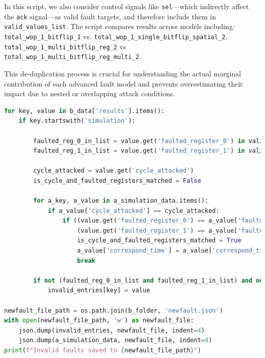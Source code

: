 In this script, we also consider control signals like \texttt{sel}—which indirectly affect the \texttt{ack} signal—as valid fault targets, and therefore include them in \texttt{valid\_values\_list}. The script compares results across models including: \texttt{total\_wop\_1\_bitflip\_1} vs. \texttt{total\_wop\_1\_single\_bitflip\_spatial\_2}, \texttt{total\_wop\_1\_multi\_bitflip\_reg\_2} vs \texttt{total\_wop\_1\_multi\_bitflip\_reg\_multi\_2}.

This de-duplication process is crucial for understanding the actual marginal contribution of each advanced fault model and prevents overestimating their impact due to nested or overlapping attack conditions.

\begin{lstlisting}[language=python, caption={newfault.py}, label={newfault}]
for key, value in b_data['results'].items():
    if key.startswith('simulation'):

        faulted_reg_0_in_list = value.get('faulted_register_0') in valid_values_list
        faulted_reg_1_in_list = value.get('faulted_register_1') in valid_values_list
        
        cycle_attacked = value.get('cycle_attacked')
        is_cycle_and_faulted_registers_matched = False
        
        for a_key, a_value in a_simulation_data.items():
            if a_value['cycle_attacked'] == cycle_attacked:
                if ((value.get('faulted_register_0') == a_value['faulted_register'] and value.get('bit_flipped_0') == a_value['bit_flipped'] and value.get('value_set_0') == a_value['value_set']) or
                    (value.get('faulted_register_1') == a_value['faulted_register'] and value.get('bit_flipped_1') == a_value['bit_flipped'] and value.get('value_set_1') == a_value['value_set'])):
                    is_cycle_and_faulted_registers_matched = True
                    a_value['correspond_time'] = a_value['correspond_time'] + 1 
                    break
        
        if not (faulted_reg_0_in_list and faulted_reg_1_in_list) and not is_cycle_and_faulted_registers_matched:
            invalid_entries[key] = value

newfault_file_path = os.path.join(b_folder, 'newfault.json')
with open(newfault_file_path, 'w') as newfault_file:
    json.dump(invalid_entries, newfault_file, indent=4)
    json.dump(a_simulation_data, newfault_file, indent=4)
print(f"Invalid faults saved to {newfault_file_path}")


\end{lstlisting}

